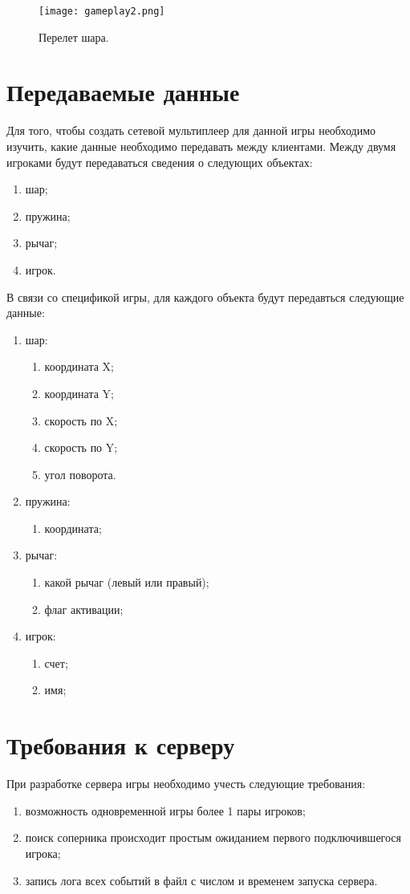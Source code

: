 \begin{figure}
  \centering
  \texttt{[image: gameplay2.png]}
  \caption{Перелет шара.}
  \label{image:gameplay2}
\end{figure}

\section{Передаваемые данные}

Для того, чтобы создать сетевой мультиплеер для данной игры необходимо изучить, какие данные необходимо передавать между клиентами. Между двумя игроками будут передаваться сведения о следующих объектах:
\begin{enumerate}
\item шар;
\item пружина;
\item рычаг;
\item игрок.
\end{enumerate}

В связи со спецификой игры, для каждого объекта будут передавться следующие данные:
\begin{enumerate}
\item шар:
	\begin{enumerate}
	\item координата X;
	\item координата Y;
	\item скорость по X;
	\item скорость по Y;
	\item угол поворота.
	\end{enumerate}	
\item пружина:
	\begin{enumerate}
	\item координата;
	\end{enumerate}
\item рычаг:
	\begin{enumerate}
	\item какой рычаг (левый или правый);
	\item флаг активации;
	\end{enumerate}
\item игрок:
	\begin{enumerate}
	\item счет;
	\item имя;
	\end{enumerate}
\end{enumerate}

\section{Требования к серверу}

При разработке сервера игры необходимо учесть следующие требования:
\begin{enumerate}
\item возможность одновременной игры более 1 пары игроков;
\item поиск соперника происходит простым ожиданием первого подключившегося игрока;
\item запись лога всех событий в файл с числом и временем запуска сервера.
\end{enumerate}

